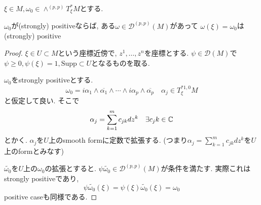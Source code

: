 \begin{tcolorbox}[mybox]
\begin{lem}
\label{lem-M-7.4.4}
$\xi \in M, \omega_0 \in \wedge^{(p,p)}T^{*}_{\xi}M$とする. 

$\omega_0$が(strongly) positiveならば, ある$\omega \in {\mathcal{D}}^{(p,p)}(M)$があって
$\omega(\xi)=\omega_0$は(strongly) positive
\end{lem}
\end{tcolorbox}
\begin{proof}
$\xi \in U \subset M$という座標近傍で, $z^1, \ldots, z^n$を座標とする. 
$\psi \in {\mathcal{D}}(M)$で$\psi \ge 0, \psi(\xi)=1, \mathrm{Supp} \subset U$となるものを取る. 

$\omega_0$をstrongly positiveとする.
$$
\omega_0
=
i\alpha_1\wedge\overline{\alpha_1}\wedge\cdots\wedge
i\alpha_p\wedge\overline{\alpha_p}
\quad
\alpha_j \in T^{* 1,0}_\xi M
$$
と仮定して良い. 
そこで
$$
\alpha_j = \sum_{k=1}^{m}c_{jk}dz^k
\quad \exists c_jk \in \mathbb{C}
$$
とかく. $\alpha_j$を$U$上のsmooth formに定数で拡張する. 
(つまり$\alpha_j = \sum_{k=1}^{m}c_{jk}dz^k$を$U$上のformとみなす)

$\widetilde{\omega_0}$を$U$上の$\omega_0$の拡張とすると. 
$\psi \widetilde{\omega_0} \in {\mathcal{D}}^{(p,p)}(M) $が条件を満たす.
実際これはstrongly positiveであり, 
$$
\psi \widetilde{\omega_0}(\xi)
=\psi(\xi)\widetilde{\omega_0}(\xi)
=\omega_0
$$
positive caseも同様である. 
\end{proof}


